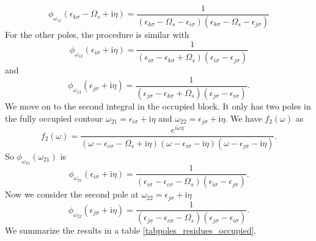 \documentclass[12pt]{caltech_thesis}
\begin{document}
\begin{equation}
\phi_{\omega_{11}}(\epsilon_{k \sigma} - \Omega_s + \mathrm{i} \eta) = \frac{1}{(\epsilon_{k \sigma} - \Omega_s -\epsilon_{i \sigma})(\epsilon_{k \sigma} - \Omega_s -\epsilon_{j \sigma})}
\end{equation}
For the other poles, the procedure is similar with
\begin{equation}
\phi_{\omega_{12}}(\epsilon_{i \sigma} + \mathrm{i} \eta) = \frac{1}{(\epsilon_{i \sigma} -\epsilon_{k \sigma}+\Omega_s)(\epsilon_{i \sigma} -\epsilon_{j \sigma})}
\end{equation}
and
\begin{equation}
\phi_{\omega_{13}}(\epsilon_{j \sigma} + \mathrm{i} \eta) = \frac{1}{(\epsilon_{j \sigma} -\epsilon_{k \sigma}+\Omega_s)(\epsilon_{j \sigma} -\epsilon_{i \sigma})}.
\end{equation}
We move on to the second integral in the occupied block. It only has two poles in the fully occupied contour $\omega_{21} = \epsilon _{i\sigma } + \mathrm{i} \eta$ and $\omega_{22} = \epsilon _{j\sigma } + \mathrm{i} \eta$. We have $f_2(\omega)$ as
\begin{equation}
f_2(\omega) = \frac{e^{i\omega \eta }}{(\omega-\epsilon_{c \sigma}-\Omega_s+\mathrm{i} \eta)(\omega-\epsilon_{i \sigma}-\mathrm{i} \eta)(\omega-\epsilon_{j \sigma}-\mathrm{i} \eta)}.
\end{equation}
So $\phi_{\omega_{21}}(\omega _{21})$ is
\begin{equation}
\phi_{\omega_{21}}(\epsilon_{i \sigma} + \mathrm{i} \eta) = \frac{1}{(\epsilon_{i \sigma} -\epsilon_{c \sigma}-\Omega_s)(\epsilon_{i \sigma} -\epsilon_{j \sigma})}.
\end{equation}
Now we consider the second pole at $\omega_{22} = \epsilon _{j\sigma } + \mathrm{i} \eta$
\begin{equation}
\phi_{\omega_{22}}(\epsilon_{j \sigma} + \mathrm{i} \eta) = \frac{1}{(\epsilon_{j \sigma} -\epsilon_{c \sigma}-\Omega_s)(\epsilon_{j \sigma} -\epsilon_{i \sigma})}.
\end{equation}
We summarize the results in a table \ref{tabpoles_residues_occupied}.\\
\end{document}
